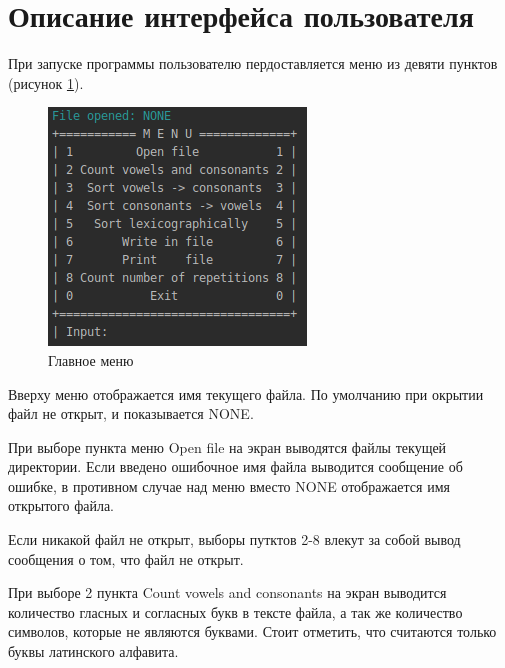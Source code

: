 \documentclass[12pt,a4paper]{article}  %
\begin{document}
\section{Описание интерфейса пользователя}
\setcounter{figure}{0}

При запуске программы пользователю пердоставляется меню из девяти пунктов (рисунок \ref{main_menu}). 

\begin{figure}[h!]
	\centering
	\includegraphics[width=0.7\linewidth]{photo/main_menu}
	\caption{Главное меню}
	\label{main_menu}
\end{figure}

Вверху меню отображается имя текущего файла. По умолчанию при окрытии файл не открыт, и показывается NONE.

При выборе пункта меню Open file на экран выводятся файлы текущей директории. Если введено ошибочное имя файла выводится сообщение об ошибке, в противном случае над меню вместо NONE отображается имя открытого файла.

Если никакой файл не открыт, выборы путктов 2-8 влекут за собой вывод сообщения о том, что файл не открыт.

При выборе 2 пункта Count vowels and consonants на экран выводится количество гласных и согласных букв в тексте файла, а так же количество символов, которые не являются буквами. Стоит отметить, что считаются только буквы латинского алфавита.
\end{document}
